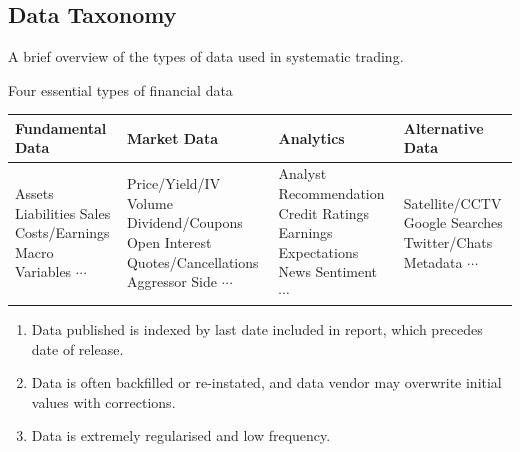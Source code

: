 \subsection{Data Taxonomy}

A brief overview of the types of data used in systematic trading.

\begin{flushleft}
Four essential types of financial data
\begin{tabularx}{\textwidth}{X|X|p{13em}|X}
\hline
\rowcolor{gray!30}
Fundamental Data & Market Data & Analytics & Alternative Data \\
\hline
Assets \newline
Liabilities \newline
Sales \newline
Costs/Earnings \newline
Macro Variables \newline
$\cdots$
&
Price/Yield/IV \newline
Volume \newline
Dividend/Coupons \newline
Open Interest \newline
Quotes/Cancellations \newline
Aggressor Side \newline
$\cdots$
&
Analyst Recommendation \newline
Credit Ratings \newline
Earnings Expectations \newline
News Sentiment \newline
$\cdots$
&
Satellite/CCTV \newline
Google Searches \newline
Twitter/Chats \newline
Metadata \newline
$\cdots$ \\
\hline
\end{tabularx}
\end{flushleft}

\begin{remark} 
\begin{enumerate}[label=\roman*.]
\setlength{\itemsep}{0pt}
\item Data published is indexed by last date included in report, which precedes date of release.
\item Data is often backfilled or re-instated, and data vendor may overwrite initial values with corrections.
\item Data is extremely regularised and low frequency.
\end{enumerate}
\end{remark}

